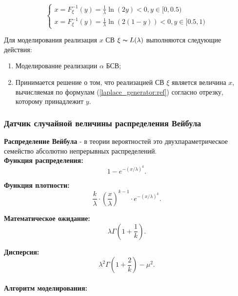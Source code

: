 \begin{equation}
	\begin{cases}
		x = F_{\xi}^{-1}(y) = \frac{1}{\lambda}\ln(2y) < 0, y \in [0, 0.5) \\
		x = F_{\xi}^{-1}(y) = \frac{1}{\lambda}\ln(2(1-y)) < 0, y \in [0.5, 1)
		\label{laplace_generator:ref}
	\end{cases}
\end{equation}

Для моделирования реализация $x$ СВ $\xi \thicksim L(\lambda)$ выполняются следующие действия:
\begin{enumerate}
	\item Моделирование реализации $\alpha$ БСВ;
	\item Принимается решение о том, что реализацией СВ $\xi$ является величина $x$, вычисляемая по формулам (\ref{laplace_generator:ref}) согласно отрезку, которому принадлежит $y$.
\end{enumerate}

\subsubsection{Датчик случайной величины распределения Вейбула}

\textbf{Распределение Вейбула} - в теории вероятностей это двухпараметрическое семейство абсолютно непрерывных распределений.\\

\textbf{Функция распределения:}
\begin{equation}
	1-e^{-(x/\lambda)^{k}}.
\end{equation}

\textbf{Функция плотности:}
\begin{equation}
	\frac{k}{\lambda} \cdot \left(\frac{x}{\lambda}\right)^{k-1} \cdot e^{-(x/\lambda)^{k}}.
\end{equation}

\textbf{Математическое ожидание:}
\begin{equation}
	\lambda\Gamma\left(1+\frac{1}{k}\right).
\end{equation}

\textbf{Дисперсия:}
\begin{equation}
	\lambda^{2}\Gamma\left(1+\frac{2}{k}\right) - \mu^{2}.
\end{equation}

\paragraph{Алгоритм моделирования:}\
\\

